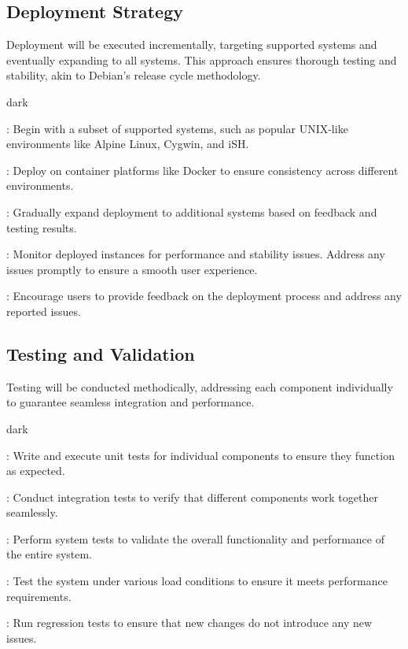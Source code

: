 \subsection{Deployment Strategy}
\label{sec:introduction:sub:deployment}
Deployment will be executed incrementally, targeting supported systems and eventually expanding to all systems.
This approach ensures thorough testing and stability, akin to Debian's release cycle methodology.
\bigskip
\begin{baseBoxOne}{}{dark}
    \begin{posnexItemize}
        \item[\sA] : Begin with a subset of supported systems, such as popular UNIX-like environments like Alpine Linux, Cygwin, and iSH.
        \item[\sA] : Deploy on container platforms like Docker to ensure consistency across different environments.
        \item[\sA] : Gradually expand deployment to additional systems based on feedback and testing results.
        \item[\sA] : Monitor deployed instances for performance and stability issues. Address any issues promptly to ensure a smooth user experience.
        \item[\sA] : Encourage users to provide feedback on the deployment process and address any reported issues.
    \end{posnexItemize}
\end{baseBoxOne}

\subsection{Testing and Validation}
\label{sec:introduction:sub:valid}
Testing will be conducted methodically, addressing each component individually to guarantee seamless integration and performance.
\bigskip
\begin{baseBoxOne}{}{dark}
    \begin{posnexItemize}
        \item[\sA] : Write and execute unit tests for individual components to ensure they function as expected.
        \item[\sA] : Conduct integration tests to verify that different components work together seamlessly.
        \item[\sA] : Perform system tests to validate the overall functionality and performance of the entire system.
        \item[\sA] : Test the system under various load conditions to ensure it meets performance requirements.
        \item[\sA] : Run regression tests to ensure that new changes do not introduce any new issues.
    \end{posnexItemize}
\end{baseBoxOne}

